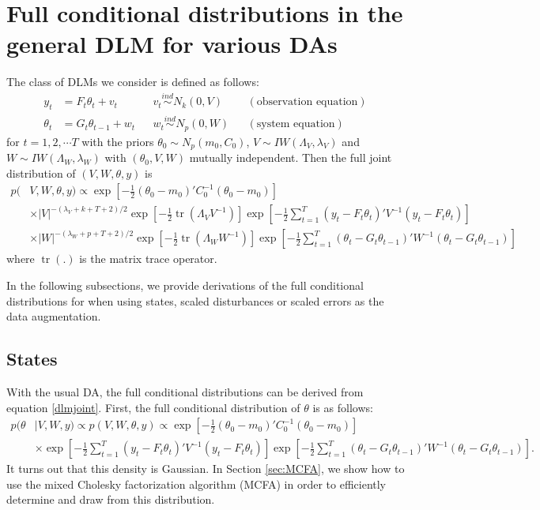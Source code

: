 \documentclass{article}
\DeclareMathOperator{\tr}{tr}
\begin{document}
\section{Full conditional distributions in the general DLM for various DAs}\label{sec:DLMfullcond}

The class of DLMs we consider is defined as follows:
\begin{align}
y_t &= F_t\theta_t + v_t && v_t \stackrel{ind}{\sim} N_k(0,V) && (\mbox{observation equation}) \label{dlmtdobseq}\\
 \theta_t &= G_t\theta_{t-1} + w_t && w_t \stackrel{ind}{\sim} N_p(0,W) && (\mbox{system equation}) \label{dlmtdsyseq}
\end{align}
for $t=1,2,\cdots T$ with the priors $\theta_0 \sim N_p(m_0, C_0)$, $V \sim IW(\Lambda_V, \lambda_V)$ and $W \sim IW(\Lambda_W, \lambda_W)$ with $(\theta_0,V,W)$ mutually independent. Then the full joint distribution of $(V,W,\theta,y)$ is
\begin{align}
  p(&V,W,\theta,y) \propto \exp\left[-\frac{1}{2}(\theta_0-m_0)'C_0^{-1}(\theta_0-m_0)\right] \nonumber\\
  &\times   |V|^{-(\lambda_V + k + T + 2)/2}\exp\left[-\frac{1}{2}\tr\left(\Lambda_VV^{-1}\right)\right] \exp\left[-\frac{1}{2}\sum_{t=1}^T(y_t - F_t\theta_t)'V^{-1}(y_t - F_t\theta_t)\right] \nonumber\\
   & \times |W|^{-(\lambda_W + p + T + 2)/2}\exp\left[-\frac{1}{2}\tr\left(\Lambda_WW^{-1}\right)\right]\exp\left[-\frac{1}{2}\sum_{t=1}^T(\theta_t-G_t\theta_{t-1})'W^{-1}(\theta_t-G_t\theta_{t-1})\right]\label{dlmjoint}
 \end{align}
where $\tr(.)$ is the matrix trace operator.

In the following subsections, we provide derivations of the full conditional distributions for when using states, scaled disturbances or scaled errors as the data augmentation. 

\subsection{States}\label{subsec:states}

With the usual DA, the full conditional distributions can be derived from equation \eqref{dlmjoint}. First, the full conditional distribution of $\theta$ is as follows:
\begin{align*}
p(\theta&|V,W,y) \propto p(V,W,\theta,y) \propto \exp\left[-\frac{1}{2}(\theta_0-m_0)'C_0^{-1}(\theta_0-m_0)\right] \\
  &\times \exp\left[-\frac{1}{2}\sum_{t=1}^T(y_t - F_t\theta_t)'V^{-1}(y_t - F_t\theta_t)\right] \exp\left[-\frac{1}{2}\sum_{t=1}^T(\theta_t-G_t\theta_{t-1})'W^{-1}(\theta_t-G_t\theta_{t-1})\right].
\end{align*}
It turns out that this density is Gaussian. In Section \ref{sec:MCFA}, we show how to use the mixed Cholesky factorization algorithm (MCFA) in order to efficiently determine and draw from this distribution.
\end{document}
